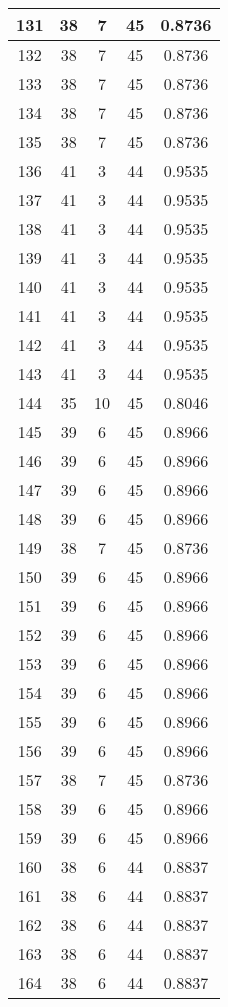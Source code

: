 \documentclass[letterpaper, 12pt]{article}
\begin{document}
\begin{longtable}{|c|c|c|c|c|}
\hline
131 & 38 & 7 & 45 & 0.8736 \\
\hline
132 & 38 & 7 & 45 & 0.8736 \\
\hline
133 & 38 & 7 & 45 & 0.8736 \\
\hline
134 & 38 & 7 & 45 & 0.8736 \\
\hline
135 & 38 & 7 & 45 & 0.8736 \\
\hline
136 & 41 & 3 & 44 & 0.9535 \\
\hline
137 & 41 & 3 & 44 & 0.9535 \\
\hline
138 & 41 & 3 & 44 & 0.9535 \\
\hline
139 & 41 & 3 & 44 & 0.9535 \\
\hline
140 & 41 & 3 & 44 & 0.9535 \\
\hline
141 & 41 & 3 & 44 & 0.9535 \\
\hline
142 & 41 & 3 & 44 & 0.9535 \\
\hline
143 & 41 & 3 & 44 & 0.9535 \\
\hline
144 & 35 & 10 & 45 & 0.8046 \\
\hline
145 & 39 & 6 & 45 & 0.8966 \\
\hline
146 & 39 & 6 & 45 & 0.8966 \\
\hline
147 & 39 & 6 & 45 & 0.8966 \\
\hline
148 & 39 & 6 & 45 & 0.8966 \\
\hline
149 & 38 & 7 & 45 & 0.8736 \\
\hline
150 & 39 & 6 & 45 & 0.8966 \\
\hline
151 & 39 & 6 & 45 & 0.8966 \\
\hline
152 & 39 & 6 & 45 & 0.8966 \\
\hline
153 & 39 & 6 & 45 & 0.8966 \\
\hline
154 & 39 & 6 & 45 & 0.8966 \\
\hline
155 & 39 & 6 & 45 & 0.8966 \\
\hline
156 & 39 & 6 & 45 & 0.8966 \\
\hline
157 & 38 & 7 & 45 & 0.8736 \\
\hline
158 & 39 & 6 & 45 & 0.8966 \\
\hline
159 & 39 & 6 & 45 & 0.8966 \\
\hline
160 & 38 & 6 & 44 & 0.8837 \\
\hline
161 & 38 & 6 & 44 & 0.8837 \\
\hline
162 & 38 & 6 & 44 & 0.8837 \\
\hline
163 & 38 & 6 & 44 & 0.8837 \\
\hline
164 & 38 & 6 & 44 & 0.8837 \\

\end{longtable}
\end{document}
